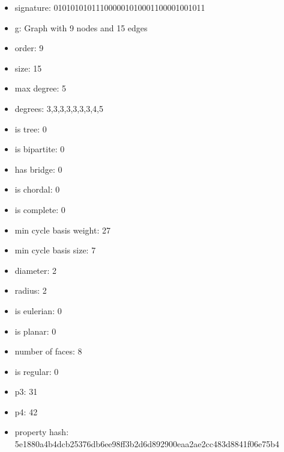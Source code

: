 \begin{figure}
\end{figure}
\begin{itemize}
\item signature: 010101010111000001010001100001001011
\item g: Graph with 9 nodes and 15 edges
\item order: 9
\item size: 15
\item max degree: 5
\item degrees: 3,3,3,3,3,3,3,4,5
\item is tree: 0
\item is bipartite: 0
\item has bridge: 0
\item is chordal: 0
\item is complete: 0
\item min cycle basis weight: 27
\item min cycle basis size: 7
\item diameter: 2
\item radius: 2
\item is eulerian: 0
\item is planar: 0
\item number of faces: 8
\item is regular: 0
\item p3: 31
\item p4: 42
\item property hash: 5e1880a4b4dcb25376db6ee98ff3b2d6d892900eaa2ae2cc483d8841f06e75b4
\end{itemize}
\newpage
